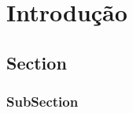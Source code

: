 \chapter{Introdução}\label{cap:introducao}

\lipsum
\section{Section}
\lipsum
\subsection{SubSection}
\lipsum
